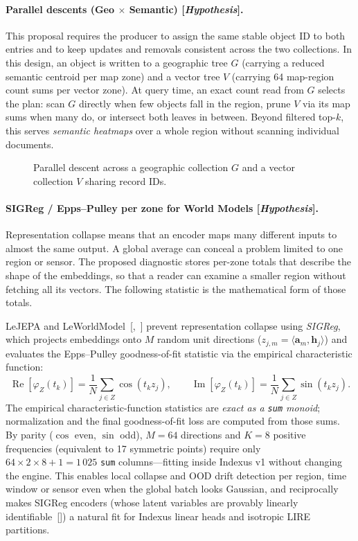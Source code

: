 \documentclass[11pt]{article}
\begin{document}
\paragraph{Parallel descents (Geo $\times$ Semantic) [\emph{Hypothesis}].}
This proposal requires the producer to assign the same stable object ID to both entries and to keep updates and removals consistent across the two collections. In this design, an object is written to a geographic tree $G$ (carrying a reduced semantic centroid per map zone) and a vector tree $V$ (carrying 64 map-region count sums per vector zone). At query time, an exact count read from $G$ selects the plan: scan $G$ directly when few objects fall in the region, prune $V$ via its map sums when many do, or intersect both leaves in between. Beyond filtered top-$k$, this serves \emph{semantic heatmaps} over a whole region without scanning individual documents.

\begin{figure}[H]
    \centering
    \caption{Parallel descent across a geographic collection $G$ and a vector collection $V$ sharing record IDs.}
\end{figure}

\paragraph{SIGReg / Epps--Pulley per zone for World Models [\emph{Hypothesis}].}
Representation collapse means that an encoder maps many different inputs to almost the same output. A global average can conceal a problem limited to one region or sensor. The proposed diagnostic stores per-zone totals that describe the shape of the embeddings, so that a reader can examine a smaller region without fetching all its vectors. The following statistic is the mathematical form of those totals.

LeJEPA and LeWorldModel~[,~] prevent representation collapse using \emph{SIGReg}, which projects embeddings onto $M$ random unit directions ($z_{j,m} = \langle \mathbf{a}_m, \mathbf{h}_j \rangle$) and evaluates the Epps--Pulley goodness-of-fit statistic via the empirical characteristic function:
\[
\operatorname{Re}[\varphi_Z(t_k)] = \frac{1}{N}\sum_{j \in Z} \cos(t_k z_j), \qquad
\operatorname{Im}[\varphi_Z(t_k)] = \frac{1}{N}\sum_{j \in Z} \sin(t_k z_j).
\]
The empirical characteristic-function statistics are \emph{exact as a \texttt{sum} monoid}; normalization and the final goodness-of-fit loss are computed from those sums. By parity ($\cos$ even, $\sin$ odd), $M = 64$ directions and $K = 8$ positive frequencies (equivalent to 17 symmetric points) require only $64 \times 2 \times 8 + 1 = 1\,025$ \texttt{sum} columns---fitting inside Indexus v1 without changing the engine. This enables local collapse and OOD drift detection per region, time window or sensor even when the global batch looks Gaussian, and reciprocally makes SIGReg encoders (whose latent variables are provably linearly identifiable~[]) a natural fit for Indexus linear heads and isotropic LIRE partitions.
\end{document}

